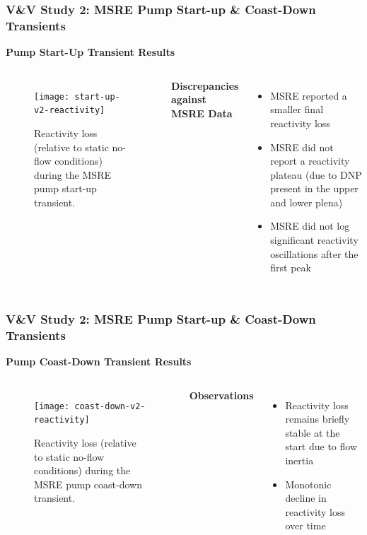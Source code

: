 \begin{frame}
  \frametitle{V\&V Study 2: MSRE Pump Start-up \& Coast-Down Transients}
  \textbf{Pump Start-Up Transient Results}
  \begin{columns}
  \column{5.5cm}
  \begin{figure}[t]
    \centering
    \texttt{[image: start-up-v2-reactivity]}
    \caption{Reactivity loss (relative to static no-flow conditions) during the \gls{MSRE} pump
    start-up transient.}
    \label{fig:start-up-reactivity}
  \end{figure}
  \column{5.5cm}
  \textbf{Discrepancies against MSRE Data}
  \begin{itemize}
    \item MSRE reported a smaller final reactivity loss
    \item MSRE did not report a reactivity plateau (due to DNP present in the upper and lower plena)
    \item MSRE did not log significant reactivity oscillations after the first peak
  \end{itemize}
  \end{columns}
\end{frame}

\begin{frame}
  \frametitle{V\&V Study 2: MSRE Pump Start-up \& Coast-Down Transients}
  \textbf{Pump Coast-Down Transient Results}
  \begin{columns}
  \column{5.5cm}
  \begin{figure}[t]
    \centering
    \texttt{[image: coast-down-v2-reactivity]}
    \caption{Reactivity loss (relative to static no-flow conditions) during the \gls{MSRE} pump
    coast-down transient.}
    \label{fig:start-up-reactivity}
  \end{figure}
  \column{5.5cm}
  \textbf{Observations}
  \begin{itemize}
    \item Reactivity loss remains briefly stable at the start due to flow inertia
    \item Monotonic decline in reactivity loss over time
  \end{itemize}
  \end{columns}
\end{frame}


